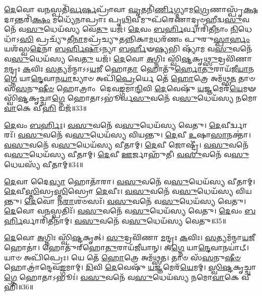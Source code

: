 \-\ul{𑌦𑍇}\-𑌵𑍋 𑌵\-\ul{𑌨}\-𑌸𑍍𑌪𑌤𑌿᳴\-\ul{𑌰𑍍𑌵}\-\-\ul{𑌰𑍍}\-𑌷𑌪𑍍𑌰𑌾᳴𑌵𑌾 \ul{𑌘𑍃}\-𑌤𑌨𑌿᳴\-\ul{𑌰𑍍𑌣𑌿}\-𑌗𑍍𑌦𑍍𑌯𑌾𑌮\-\ul{𑌗𑍍𑌰𑍇}\-𑌣𑌾𑌸𑍍𑌪𑍃᳴\-\ul{𑌕𑍍𑌷}\-𑌦𑌾𑌨𑍍𑌤𑌰𑌿᳴\-\ul{𑌕𑍍𑌷𑌂} 𑌮𑌧𑍍𑌯𑍇᳴𑌨𑌾𑌪𑍍𑌰𑌾𑌃 𑌪𑍃\-\ul{𑌥𑌿}\-𑌵𑍀𑌮𑍁𑌪᳴𑌰𑍇𑌣𑌾𑌦𑍃𑍞𑌹𑍀𑌦𑍍𑌵\-\ul{𑌸𑍁}\-𑌵𑌨𑍇᳴ 𑌵\-\ul{𑌸𑍁}\-𑌧𑍇𑌯᳴𑌸𑍍𑌯 𑌵𑍇\-\ul{𑌤𑍁} 𑌯𑌜᳴।
\-\ul{𑌦𑍇}\-𑌵𑌂 \ul{𑌬}\-\-\ul{𑌰𑍍}\-𑌹𑌿𑌰𑍍𑌵𑌾𑌰𑌿᳴𑌤𑍀𑌨𑌾𑌂 \ul{𑌨𑌿}\-𑌧𑍇𑌧𑌾᳴𑌽\-\ul{𑌸𑌿} 𑌪𑍍𑌰𑌚𑍍𑌯𑍁᳴𑌤𑍀\-\ul{𑌨𑌾}\-𑌮𑌪𑍍𑌰᳴\-𑌚𑍍𑌯𑍁𑌤𑌨𑍍𑌨𑌿𑌕𑌾\-\ul{𑌮}\-𑌧𑌰᳴𑌣𑌂 𑌪𑍁𑌰𑍁\-\ul{𑌸𑍍𑌪𑌾}\-\-\ul{𑌰𑍍}\-𑌹𑌂 𑌯𑌶᳴𑌸𑍍𑌵\-\ul{𑌦𑍇}\-𑌨𑌾 \ul{𑌬}\-\-\ul{𑌰𑍍}\-𑌹𑌿\-\ul{𑌷𑌾}\-\-𑌽𑌨𑍍𑌯𑌾 \ul{𑌬}\-\-\ul{𑌰𑍍}\-𑌹𑍀𑍟\-\ul{𑌷𑍍𑌯}\-𑌭𑌿 𑌷𑍍𑌯𑌾᳴𑌮 𑌵\-\ul{𑌸𑍁}\-𑌵𑌨𑍇᳴ 𑌵\-\ul{𑌸𑍁}\-𑌧𑍇𑌯᳴𑌸𑍍𑌯 𑌵𑍇\-\ul{𑌤𑍁} 𑌯𑌜᳴।
\-\ul{𑌦𑍇}\-𑌵𑍋 \ul{𑌅}\-𑌗𑍍𑌨𑌿𑌃 𑌸𑍍𑌵𑌿᳴\-\ul{𑌷𑍍𑌟}\-𑌕𑍃\-\ul{𑌥𑍍𑌸𑍁}\-𑌦𑍍𑌰𑌵𑌿᳴𑌣𑌾 \ul{𑌮}\-𑌨𑍍𑌦𑍍𑌰𑌃 \ul{𑌕}\-𑌵𑌿𑌃 \ul{𑌸}\-𑌤𑍍𑌯𑌮᳴𑌨𑍍𑌮𑌾\-𑌽𑌽\-\ul{𑌯}\-𑌜𑍀 𑌹𑍋\-\ul{𑌤𑌾} 𑌹𑍋𑌤𑍁᳴\-\ul{𑌰𑍍}\-𑌹𑍋\-\ul{𑌤𑍁}\-𑌰𑌾𑌯᳴𑌜𑍀\-\ul{𑌯𑌾}\-𑌨\-\ul{𑌗𑍍𑌨𑍇} 𑌯𑌾\-\ul{𑌨𑍍𑌦𑍇}\-𑌵𑌾𑌨\-\ul{𑌯𑌾}\-𑌡𑍍𑌯𑌾𑍞 𑌅𑌪𑌿᳴\-\ul{𑌪𑍍𑌰𑍇}\-𑌰𑍍𑌯𑍇 𑌤𑍇᳴ \ul{𑌹𑍋}\-𑌤𑍍𑌰𑍇 𑌅𑌮᳴𑌥𑍍𑌸\-\ul{𑌤} 𑌤𑌾𑍞 𑌸᳴\-\ul{𑌸}\-𑌨𑍁\-\ul{𑌷𑍀}\-\-\ul{𑍞} 𑌹𑍋𑌤𑍍𑌰𑌾𑌂 𑌦𑍇𑌵\-\ul{𑌙𑍍𑌗}\-𑌮𑌾\-\ul{𑌨𑍍𑌦𑌿}\-𑌵𑌿 \ul{𑌦𑍇}\-𑌵𑍇𑌷𑍁᳴ \ul{𑌯}\-𑌜𑍍𑌞𑌮𑍇𑌰᳴\-\ul{𑌯𑍇}\-𑌮𑍟 𑌸𑍍𑌵𑌿᳴\-\ul{𑌷𑍍𑌟}\-𑌕𑍃𑌚𑍍𑌚𑌾\-\ul{𑌗𑍍𑌨𑍇} 𑌹𑍋𑌤𑌾\-𑌽𑌭𑍂॑𑌰𑍍𑌵\-\ul{𑌸𑍁}\-𑌵𑌨𑍇᳴ 𑌵\-\ul{𑌸𑍁}\-𑌧𑍇𑌯᳴𑌸𑍍𑌯 𑌨𑌮𑍋\-\ul{𑌵𑌾}\-𑌕𑍇 𑌵𑍀\-\ul{𑌹𑌿} 𑌯𑌜᳴॥33॥\anuvakamend[𑌯𑌜𑍈𑌕𑌂᳴ 𑌚]

\-\ul{𑌦𑍇}\-𑌵𑌂 \ul{𑌬}\-\-\ul{𑌰𑍍}\-𑌹𑌿𑌃।
\-\ul{𑌵}\-\-\ul{𑌸𑍁}\-𑌵𑌨𑍇᳴ 𑌵\-\ul{𑌸𑍁}\-𑌧𑍇𑌯᳴𑌸𑍍𑌯 𑌵𑍇𑌤𑍁।
\-\ul{𑌦𑍇}\-𑌵𑍀𑌰𑍍𑌦𑍍𑌵𑌾𑌰𑌃᳴।
\-\ul{𑌵}\-\-\ul{𑌸𑍁}\-𑌵𑌨𑍇᳴ 𑌵\-\ul{𑌸𑍁}\-𑌧𑍇𑌯᳴𑌸𑍍𑌯 𑌵𑌿𑌯𑌨𑍍𑌤𑍁।
\-\ul{𑌦𑍇}\-𑌵𑍀 \ul{𑌉}\-𑌷𑌾\-\ul{𑌸𑌾}\-𑌨𑌕𑍍𑌤𑌾॑।
\-\ul{𑌵}\-\-\ul{𑌸𑍁}\-𑌵𑌨𑍇᳴ 𑌵\-\ul{𑌸𑍁}\-𑌧𑍇𑌯᳴𑌸𑍍𑌯 𑌵𑍀𑌤𑌾𑌮𑍍।
\-\ul{𑌦𑍇}\-𑌵𑍀 𑌜𑍋𑌷𑍍𑌟𑍍𑌰𑍀॑।
\-\ul{𑌵}\-\-\ul{𑌸𑍁}\-𑌵𑌨𑍇᳴ 𑌵\-\ul{𑌸𑍁}\-𑌧𑍇𑌯᳴𑌸𑍍𑌯 𑌵𑍀𑌤𑌾𑌮𑍍।
\-\ul{𑌦𑍇}\-𑌵𑍀 \ul{𑌊}\-𑌰𑍍𑌜𑌾𑌹𑍁᳴𑌤𑍀।
\-\ul{𑌵}\-\-\ul{𑌸𑍁}\-𑌵𑌨𑍇᳴ 𑌵\-\ul{𑌸𑍁}\-𑌧𑍇𑌯𑌸𑍍𑌯᳴ 𑌵𑍀𑌤𑌾𑌮𑍍॥34॥

\-\ul{𑌦𑍇}\-𑌵𑌾 𑌦𑍈\-\ul{𑌵𑍍𑌯𑌾} 𑌹𑍋𑌤𑌾᳴𑌰𑌾।
\-\ul{𑌵}\-\-\ul{𑌸𑍁}\-𑌵𑌨𑍇᳴ 𑌵\-\ul{𑌸𑍁}\-𑌧𑍇𑌯᳴𑌸𑍍𑌯 𑌵𑍀𑌤𑌾𑌮𑍍।
\-\ul{𑌦𑍇}\-𑌵𑍀\-\ul{𑌸𑍍𑌤𑌿}\-𑌸𑍍𑌰\-\ul{𑌸𑍍𑌤𑌿}\-𑌸𑍍𑌰𑍋 \ul{𑌦𑍇}\-𑌵𑍀𑌃।
\-\ul{𑌵}\-\-\ul{𑌸𑍁}\-𑌵𑌨𑍇᳴ 𑌵\-\ul{𑌸𑍁}\-𑌧𑍇𑌯᳴𑌸𑍍𑌯 𑌵𑌿𑌯𑌨𑍍𑌤𑍁।
\-\ul{𑌦𑍇}\-𑌵𑍋 𑌨\-\ul{𑌰𑌾}\-𑌶𑍞𑌸𑌃᳴।
\-\ul{𑌵}\-\-\ul{𑌸𑍁}\-𑌵𑌨𑍇᳴ 𑌵\-\ul{𑌸𑍁}\-𑌧𑍇𑌯᳴𑌸𑍍𑌯 𑌵𑍇𑌤𑍁।
\-\ul{𑌦𑍇}\-𑌵𑍋 𑌵\-\ul{𑌨}\-𑌸𑍍𑌪𑌤𑌿𑌃᳴।
\-\ul{𑌵}\-\-\ul{𑌸𑍁}\-𑌵𑌨𑍇᳴ 𑌵\-\ul{𑌸𑍁}\-𑌧𑍇𑌯᳴𑌸𑍍𑌯 𑌵𑍇𑌤𑍁।
\-\ul{𑌦𑍇}\-𑌵𑌂 \ul{𑌬}\-\-\ul{𑌰𑍍}\-𑌹𑌿𑌰𑍍𑌵𑌾𑌰𑌿᳴𑌤𑍀𑌨𑌾𑌮𑍍।
\-\ul{𑌵}\-\-\ul{𑌸𑍁}\-𑌵𑌨𑍇᳴ 𑌵\-\ul{𑌸𑍁}\-𑌧𑍇𑌯᳴𑌸𑍍𑌯 𑌵𑍇𑌤𑍁॥35॥

\-\ul{𑌦𑍇}\-𑌵𑍋 \ul{𑌅}\-𑌗𑍍𑌨𑌿𑌃 𑌸𑍍𑌵𑌿᳴\-\ul{𑌷𑍍𑌟}\-𑌕𑍃𑌤𑍍।
\-\ul{𑌸𑍁}\-𑌦𑍍𑌰𑌵𑌿᳴𑌣𑌾 \ul{𑌮}\-𑌨𑍍𑌦𑍍𑌰𑌃 \ul{𑌕}\-𑌵𑌿𑌃।
\-\ul{𑌸}\-𑌤𑍍𑌯𑌮᳴𑌨𑍍𑌮𑌾\-\ul{𑌯}\-𑌜𑍀 𑌹𑍋𑌤𑌾॑।
𑌹𑍋𑌤𑍁᳴𑌰𑍍‌\mbox{}𑌹𑍋\-\ul{𑌤𑍁}\-𑌰𑌾𑌯᳴𑌜𑍀𑌯𑌾𑌨𑍍।
𑌅\-\ul{𑌗𑍍𑌨𑍇} 𑌯𑌾\-\ul{𑌨𑍍𑌦𑍇}\-𑌵𑌾𑌨𑌯𑌾॑𑌟𑍍।
𑌯𑌾𑍞 𑌅𑌪𑌿᳴𑌪𑍍𑌰𑍇𑌃।
𑌯𑍇 𑌤𑍇᳴ \ul{𑌹𑍋}\-𑌤𑍍𑌰𑍇 𑌅𑌮᳴𑌥𑍍𑌸𑌤।
𑌤𑌾𑍞 𑌸᳴\-\ul{𑌸}\-𑌨𑍁\-\ul{𑌷𑍀}\-\-\ul{𑍞} 𑌹𑍋𑌤𑍍𑌰𑌾॑𑌨𑍍𑌦𑍇𑌵\-\ul{𑌙𑍍𑌗}\-𑌮𑌾𑌮𑍍।
\-\ul{𑌦𑌿}\-𑌵𑌿 \ul{𑌦𑍇}\-𑌵𑍇𑌷𑍁᳴ \ul{𑌯}\-𑌜𑍍𑌞𑌮𑍇𑌰᳴\-\ul{𑌯𑍇}\-𑌮𑌮𑍍।
\-\ul{𑌸𑍍𑌵𑌿}\-\-\ul{𑌷𑍍𑌟}\-𑌕𑍃𑌚𑍍𑌚𑌾\-\ul{𑌗𑍍𑌨𑍇} 𑌹𑍋𑌤𑌾\-𑌽𑌭𑍂𑌃॑।
\-\ul{𑌵}\-\-\ul{𑌸𑍁}\-𑌵𑌨𑍇᳴ 𑌵\-\ul{𑌸𑍁}\-𑌧𑍇𑌯᳴𑌸𑍍𑌯 𑌨𑌮𑍋\-\ul{𑌵𑌾}\-𑌕𑍇 𑌵𑍀𑌹𑌿᳴॥36॥\anuvakamend[\-\ul{𑌵𑍀}\-\-\ul{𑌤𑌾𑌂} \ul{𑌵𑍇}\-𑌤𑍍𑌵\-\ul{𑌭𑍂}\-𑌰𑍇𑌕𑌂᳴ 𑌚]

